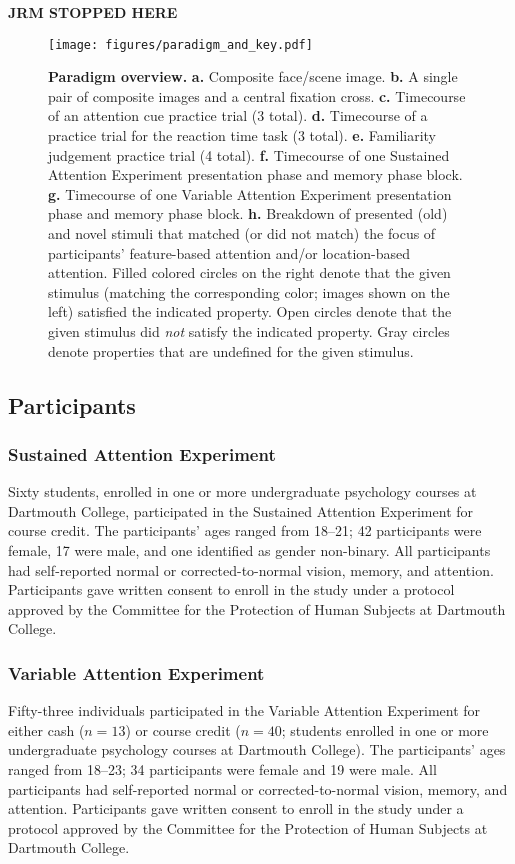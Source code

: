 \documentclass[english]{article}
\begin{document}
\textbf{JRM STOPPED HERE}

\begin{figure*}[tp]
  \centering
  \texttt{[image: figures/paradigm\_and\_key.pdf]}

  \caption{\textbf{Paradigm overview.} \textbf{a.} Composite face/scene image.
  \textbf{b.} A single pair of composite images and a central fixation cross.
  \textbf{c.} Timecourse of an attention cue practice trial (3 total).
  \textbf{d.} Timecourse of a practice trial for the reaction time task (3
  total). \textbf{e.} Familiarity judgement practice trial (4 total).
  \textbf{f.} Timecourse of one Sustained Attention Experiment presentation
  phase and memory phase block. \textbf{g.} Timecourse of one Variable
  Attention Experiment presentation phase and memory phase block. \textbf{h.}
  Breakdown of presented (old) and novel stimuli that matched (or did not
  match) the focus of participants' feature-based attention and/or
  location-based attention. Filled colored circles on the right denote that the
  given stimulus (matching the corresponding color; images shown on the left)
  satisfied the indicated property. Open circles denote that the given stimulus
  did \textit{not} satisfy the indicated property. Gray circles denote
  properties that are undefined for the given stimulus.}

\label{fig:paradigm}
\end{figure*}

\subsection*{Participants}
\subsubsection*{Sustained Attention Experiment}
Sixty students, enrolled in one or more undergraduate psychology courses at Dartmouth College, participated in the Sustained Attention Experiment for course credit.  The participants' ages ranged from 18--21; 42 participants were female, 17 were male, and one identified as gender non-binary.  All participants had self-reported normal or corrected-to-normal vision, memory, and attention.  Participants gave written consent to enroll in the study under a protocol approved by the Committee for the Protection of Human Subjects at Dartmouth College.

\subsubsection*{Variable Attention Experiment}
Fifty-three individuals participated in the Variable Attention Experiment for either cash ($n=13$) or course credit ($n=40$; students enrolled in one or more undergraduate psychology courses at Dartmouth College).  The participants' ages ranged from 18--23; 34 participants were female and 19 were male.  All participants had self-reported normal or corrected-to-normal vision, memory, and attention.  Participants gave written consent to enroll in the study under a protocol approved by the Committee for the Protection of Human Subjects at Dartmouth College.
\end{document}
